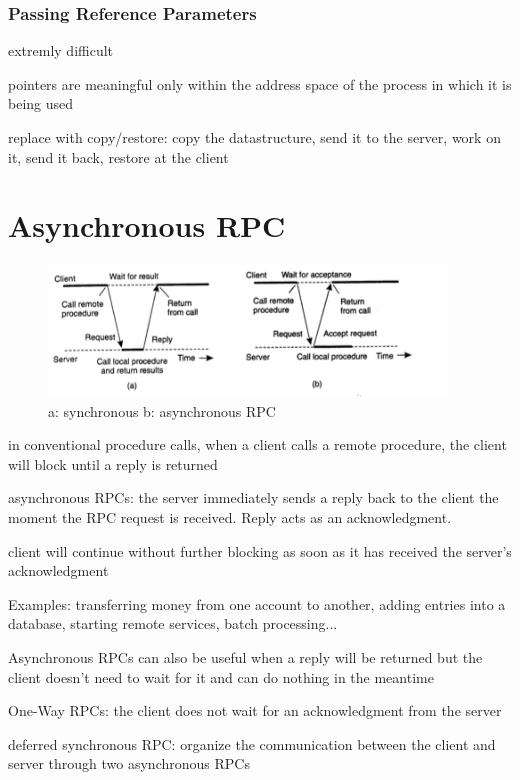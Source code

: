 \documentclass[ngerman,a4paper]{report}
\begin{document}
\subsubsection*{Passing Reference Parameters}
\begin{compactitem}
	\item extremly difficult
	\item pointers are meaningful only within the address space of the process in which it is being used
	\item replace with copy/restore: copy the datastructure, send it to the server, work on it, send it back, restore at the client
\end{compactitem}



\section{Asynchronous RPC}

\begin{figure}[h]
	\centering
	\includegraphics[width=400px]{gfx/rpc.png}
	\caption{a: synchronous b: asynchronous RPC}
	\label{img:rpc}
\end{figure}

\begin{compactitem}
	\item in conventional procedure calls, when a client calls a remote procedure, the client will block until a reply is returned
	\item asynchronous RPCs: the server immediately sends a reply back to the client the moment the RPC request is received. Reply acts as an acknowledgment.
	\item client will continue without further blocking as soon as it has received the server's acknowledgment
	\item Examples: transferring money from one account to another, adding entries into a database, starting remote services, batch processing...
	\item Asynchronous RPCs can also be useful when a reply will be returned but the client doesn't need to wait for it and can do nothing in the meantime
	\item One-Way RPCs: the client does not wait for an acknowledgment from the server
	\item deferred synchronous RPC: organize the communication between the client and server through two asynchronous RPCs
\end{compactitem}
\end{document}
